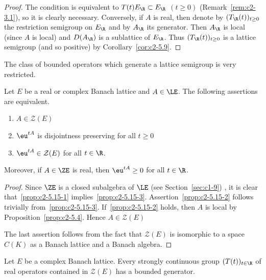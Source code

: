 \begin{proof}
The condition is equivalent to $T(t)E_{\R} \subset E_{\R}$ $(t \geq 0)$ (\cf Remark~\ref{rem:c2-3.1}), so it is clearly necessary.
Conversely, if\/ $A$ is real, then denote by $(T_{\R}(t))_{t \geq 0}$ the restriction semigroup on $E_{\R}$ and by $A_{\R}$ its generator.
Then $A_{\R}$ is local (since $A$ is local) and $D(A_{\R})$ is a sublattice of\/ $E_{\R}$.
Thus $(T_{\R}(t))_{t \geq 0}$ is a lattice semigroup (and so positive) by Corollary~\ref{cor:c2-5.9}.
\end{proof}
The class of bounded operators which generate a lattice semigroup is very restricted.
\begin{proposition}\label{prop:c2-5.15}
%
Let $E$ be a real or complex Banach lattice and $A \in \LE$. 
The following assertions are equivalent.
\begin{enumerate}[\upshape (a)]
\item \label{prop:c2-5.15-1}
$A \in \mathcal{Z}(E)$
\item \label{prop:c2-5.15-2}
$\eu^{tA}$ is disjointness preserving for all $t \geq 0$
\item \label{prop:c2-5.15-3}
$\eu^{tA} \in \mathcal{Z}(E)$ for all $t \in \R$.
\end{enumerate}
Moreover, if\/ $A \in \ZE$ is real, then $\eu^{tA} \geq 0$ for all $t \in \R$.
\end{proposition}
\begin{proof}
Since $\ZE$ is a closed subalgebra of\/ $\LE$ (see Section~\ref{sec:c1-9})
, it is clear that~\ref{prop:c2-5.15-1}   implies~\ref{prop:c2-5.15-3}.
Assertion~\ref{prop:c2-5.15-2}  follows trivially from~\ref{prop:c2-5.15-3}.
If~\ref{prop:c2-5.15-2}   holds, then $A$ is local by  Proposition~\ref{prop:c2-5.4}.
Hence $A \in \mathcal{Z}(E)$

The last assertion follows from the fact that $\mathcal{Z}(E)$ is isomorphic to a space $C(K)$ as a Banach lattice and a Banach algebra.
\end{proof}
\begin{proposition}\label{prop:c2-5.16}
%
Let $E$ be a complex Banach lattice.
Every strongly continuous group $(T(t))_{t \in \R}$ of real operators contained in $\mathcal{Z}(E)$ has a bounded generator.
\end{proposition}
